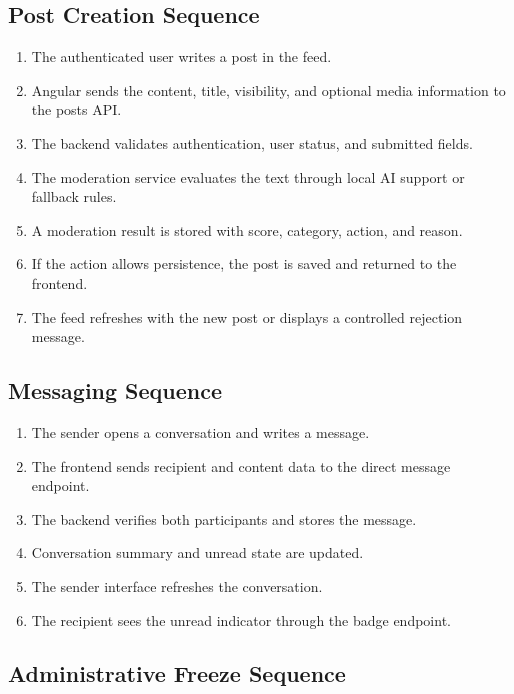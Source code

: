\subsection{Post Creation Sequence}

\begin{enumerate}
    \item The authenticated user writes a post in the feed.
    \item Angular sends the content, title, visibility, and optional media information to the posts API.
    \item The backend validates authentication, user status, and submitted fields.
    \item The moderation service evaluates the text through local AI support or fallback rules.
    \item A moderation result is stored with score, category, action, and reason.
    \item If the action allows persistence, the post is saved and returned to the frontend.
    \item The feed refreshes with the new post or displays a controlled rejection message.
\end{enumerate}

\subsection{Messaging Sequence}

\begin{enumerate}
    \item The sender opens a conversation and writes a message.
    \item The frontend sends recipient and content data to the direct message endpoint.
    \item The backend verifies both participants and stores the message.
    \item Conversation summary and unread state are updated.
    \item The sender interface refreshes the conversation.
    \item The recipient sees the unread indicator through the badge endpoint.
\end{enumerate}

\subsection{Administrative Freeze Sequence}

